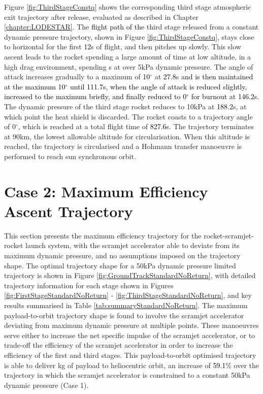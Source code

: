 Figure \ref{fig:ThirdStageConstq} shows the corresponding third stage atmospheric exit trajectory after release, evaluated as described in Chapter \ref{chapter:LODESTAR}. The \textcolor{black}{flight path of the} third stage released from a constant dynamic pressure trajectory, shown in Figure \ref{fig:ThirdStageConstq}, stays close to horizontal for the first \textcolor{black}{12}s of flight, and then pitches up slowly. This slow ascent leads to the rocket spending a large amount of time at low altitude, in a high drag environment, spending \thirdqOverFiveConstqNoReturn s at over 5kPa dynamic pressure. The angle of attack increases gradually to a maximum of \textcolor{black}{10}$^\circ$ at \textcolor{black}{27.8}s \textcolor{black}{and is then maintained at the maximum 10$^\circ$ until 111.7s, when the angle of attack is reduced slightly, increased to the maximum briefly, and finally reduced to 0$^\circ$ for burnout at 146.2s}. The dynamic pressure of the third stage rocket reduces to 10kPa at \textcolor{black}{188.2}s, at which point the heat shield is discarded. The rocket coasts to a trajectory angle of 0$^\circ$, which is reached at a total flight time of \textcolor{black}{827.6}s. The trajectory terminates at 90km, the lowest allowable altitude for circularisation. 
When this altitude is reached, the trajectory is circularised and a Hohmann transfer manoeuvre is performed to reach sun synchronous orbit.






\section{Case 2: Maximum Efficiency Ascent Trajectory}\label{sec:optimisednoreturn}

This section presents the maximum efficiency trajectory for the rocket-scramjet-rocket launch system, with the scramjet accelerator able to deviate from its maximum dynamic pressure, and no assumptions imposed on the trajectory shape. 
The optimal trajectory shape for a 50kPa dynamic pressure limited trajectory is shown in Figure \ref{fig:GroundTrackStandardNoReturn}, with detailed trajectory information for each stage shown in Figures \ref{fig:FirstStageStandardNoReturn} - \ref{fig:ThirdStageStandardNoReturn}, and key results summarised in Table \ref{tab:summaryStandardNoReturn}. The maximum payload-to-orbit trajectory shape is found to involve the scramjet accelerator deviating from maximum dynamic pressure at multiple points. These manoeuvres serve either to increase the net specific impulse of the scramjet accelerator, or to trade-off the efficiency of the scramjet accelerator in order to increase the efficiency of the first and third stages. 
This payload-to-orbit optimised trajectory is able to deliver \PayloadToOrbitStandardNoReturn kg of payload to heliocentric orbit, an increase of \textcolor{black}{59.1}\% over the trajectory in which the scramjet accelerator is constrained to a constant 50kPa dynamic pressure (Case 1).

